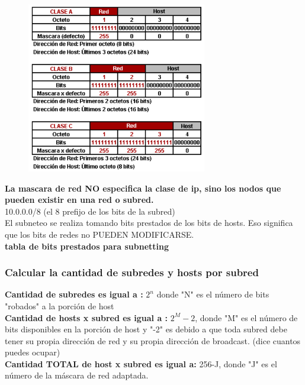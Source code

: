 \documentclass[letterpaper,12pt]{article}
\begin{document}
\begin{sloppypar}
\begin{figure}[H]
    \centering
    \includegraphics[width=0.7\textwidth]{redes4.png}
\end{figure}
\textbf{La mascara de red NO especifica la clase de ip, sino los nodos que pueden existir en una red o subred.}
\vspace{0.3cm}\\ 
10.0.0.0/8 (el 8 prefijo de los bits de la subred)
\vspace{0.3cm}\\ 
El subneteo se realiza tomando bits prestados de los bits de hosts. Eso significa que los bits de redes no PUEDEN MODIFICARSE.
\vspace{0.3cm}\\ 
\textbf{tabla de bits prestados para subnetting}
\newpage
\subsubsection{Calcular la cantidad de subredes y hosts por subred}
\textbf{Cantidad de subredes es igual a :} $2^n$ donde "N" es el número de bits "robados" a la porción de host
\vspace{0.3cm}\\ 
\textbf{Cantidad de hosts x subred es igual a :} $2^M - 2$, donde "M" es el número de bits disponibles en la porción de host y "-2" es debido a que toda subred debe tener su propia dirección de red y su propia dirección de broadcast. (dice cuantos puedes ocupar)
\vspace{0.3cm}\\ 
\textbf{Cantidad TOTAL de host x subred es igual a:} 256-J, donde "J" es el número de la máscara de red adaptada.


\end{sloppypar}
\end{document}

